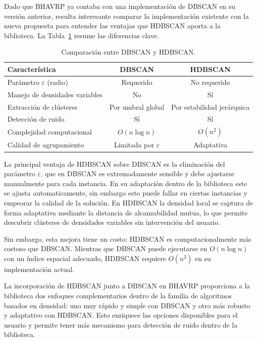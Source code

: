Dado que BHAVRP ya contaba con una implementación de DBSCAN en su versión anterior, resulta interesante comparar la implementación existente con la nueva propuesta para entender las ventajas que HDBSCAN aporta a la biblioteca. La Tabla~\ref{tab:dbscan_vs_hdbscan} resume las diferencias clave.

\begin{table}[H]
\centering
\caption{Comparación entre DBSCAN y HDBSCAN.}
\label{tab:dbscan_vs_hdbscan}
\small
\begin{tabular}{@{}lcc@{}}
\toprule
\textbf{Característica} & \textbf{DBSCAN} & \textbf{HDBSCAN} \\
\midrule
Parámetro \(\varepsilon\) (radio) & Requerido & No requerido \\
Manejo de densidades variables & No & Sí \\
Extracción de clústeres & Por umbral global & Por estabilidad jerárquica \\
Detección de ruido & Sí & Sí \\
Complejidad computacional & \(O(n \log n)\) & \(O(n^2)\) \\
Calidad de agrupamiento & Limitada por \(\varepsilon\) & Adaptativa \\
\bottomrule
\end{tabular}
\end{table}

La principal ventaja de HDBSCAN sobre DBSCAN es la eliminación del parámetro \(\varepsilon\), que en DBSCAN es extremadamente sensible y debe ajustarse manualmente para cada instancia. En su adaptación dentro de la biblioteca este se ajusta automaticamente, sin embargo esto puede fallar en ciertas instancias y empeorar la calidad de la solución. En HDBSCAN la densidad local se captura de forma adaptativa mediante la distancia de alcanzabilidad mutua, lo que permite descubrir clústeres de densidades variables sin intervención del usuario.

Sin embargo, esta mejora tiene un costo: HDBSCAN es computacionalmente más costoso que DBSCAN. Mientras que DBSCAN puede ejecutarse en \(O(n \log n)\) con un índice espacial adecuado, HDBSCAN requiere \(O(n^2)\) en su implementación actual.

La incorporación de HDBSCAN junto a DBSCAN en BHAVRP proporciona a la biblioteca dos enfoques complementarios dentro de la familia de algoritmos basados en densidad: uno muy rápido y simple con DBSCAN y otro más robusto y adaptativo con HDBSCAN. Esto enriquece las opciones disponibles para el usuario y permite tener más mecanismo para detección de ruido dentro de la biblioteca.

